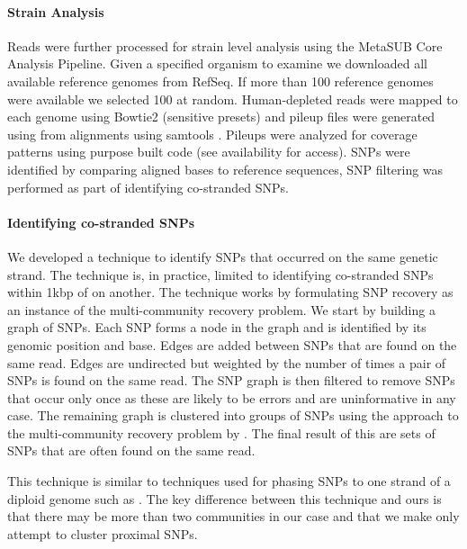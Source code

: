 \paragraph{Strain Analysis}
Reads were further processed for strain level analysis using the MetaSUB Core Analysis Pipeline. Given a specified organism to examine we downloaded all available reference genomes from RefSeq. If more than 100 reference genomes were available we selected 100 at random. Human-depleted reads were mapped to each genome using Bowtie2 (sensitive presets) and pileup files were generated using from alignments using samtools \citep{Li2009}.  Pileups were analyzed for coverage patterns using purpose built code (see availability for access). SNPs were identified by comparing aligned bases to reference sequences, SNP filtering was performed as part of identifying co-stranded SNPs.


\paragraph{Identifying co-stranded SNPs}
We developed a technique to identify SNPs that occurred on the same genetic strand. The technique is, in practice, limited to identifying co-stranded SNPs within 1kbp of on another. The technique works by formulating SNP recovery as an instance of the multi-community recovery problem. We start by building a graph of SNPs. Each SNP forms a node in the graph and is identified by its genomic position and base. Edges are added between SNPs that are found on the same read. Edges are undirected but weighted by the number of times a pair of SNPs is found on the same read. The SNP graph is then filtered to remove SNPs that occur only once as these are likely to be errors and are uninformative in any case. The remaining graph is clustered into groups of SNPs using the approach to the multi-community recovery problem by \cite{Blondel_2008}. The final result of this are sets of SNPs that are often found on the same read.

This technique is similar to techniques used for phasing SNPs to one strand of a diploid genome such as \cite{Zheng2016}. The key difference between this technique and ours is that there may be more than two communities in our case and that we make only attempt to cluster proximal SNPs.








